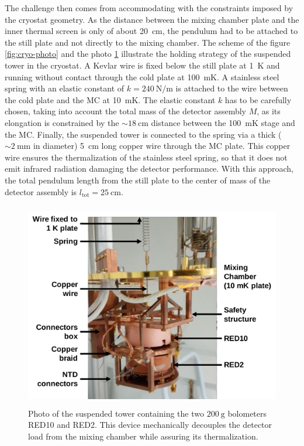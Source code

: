 The challenge then comes from accommodating with the constraints imposed by the cryostat geometry. As the distance between the mixing chamber plate and the inner thermal screen is only of about \SI{20}{\cm}, the pendulum had to be attached to the still plate and not directly to the mixing chamber.
The scheme of the figure \ref{fig:cryo-photo} and the photo \ref{fig:suspended-tower} illustrate the holding strategy of the suspended tower in the cryostat. 
A Kevlar wire is fixed below the still plate at \SI{1}{\kelvin} and running without contact through the cold plate at \SI{100}{\milli\kelvin}. 
A stainless steel spring with an elastic constant of $k=\SI{240}{\newton\per\meter}$ is attached to the wire between the cold plate and the MC at \SI{10}{\milli\kelvin}. The elastic constant $k$ has to be carefully chosen, taking into account the total mass of the detector assembly $M$, as its elongation is constrained by the $\sim \SI{18}{\cm}$ distance between the \SI{100}{\milli\kelvin} stage and the MC. 
Finally, the suspended tower is connected to the spring via a thick ($\sim \SI{2}{\mm}$ in diameter) \SI{5}{\cm} long copper wire through the MC plate. This copper wire ensures the thermalization of the stainless steel spring, so that it does not emit infrared radiation damaging the detector performance.
With this approach, the total pendulum length from the still plate to the center of mass of the detector assembly is $l_{\textrm{tot}} = \SI{25}{\cm}$.


\begin{figure}
\centering
\captionsetup{justification=centering}
\includegraphics[height=9cm]{graphics/damocles.png}
\caption{Photo of the suspended tower containing the two $\SI{200}{\g}$ bolometers RED10 and RED2. This device mechanically decouples the detector load from the mixing chamber while assuring its thermalization.}
\label{fig:suspended-tower} 
\end{figure}

